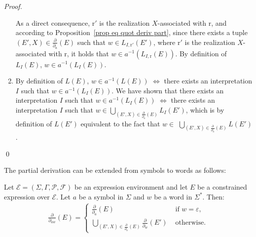 \documentclass[a4paper]{llncs}
\begin{document}
\begin{proof}
\begin{enumerate}
      As a direct consequence, $\mathrm{r}'$ is the realization $X$-associated with $\mathrm{r}$, and according to Proposition~\ref{prop eq quot deriv part}, since there exists a tuple $(E',X)\in\frac{\partial}{\partial_a}(E)$ such that $w \in L_{I,\mathrm{r}'}(E')$, where $\mathrm{r}'$ is the realization $X$-associated with $\mathrm{r}$, it holds that $w\in a^{-1}(L_{I,\mathrm{r}}(E))$. By definition of $L_{I}(E)$, $w\in a^{-1}(L_{I}(E))$.
\item By definition of $L(E)$, $w\in a^{-1}(L(E))$ $\Leftrightarrow$ there exists an interpretation $I$ such that $w\in a^{-1}(L_I(E))$. We have shown that there exists an interpretation $I$ such that $w\in a^{-1}(L_I(E))$ $\Leftrightarrow$ there exists an interpretation $I$ such that $w\in \bigcup_{(E',X)\in\frac{\partial}{\partial_a}(E)} L_I(E')$, 
which is by definition of $L(E')$ equivalent to the fact that $w\in$ $ \bigcup_{(E',X)\in\frac{\partial}{\partial_a}(E)} L(E')$. 
    \end{enumerate}
    \qed
  \end{proof}
  
  The partial derivation can be extended from symbols to words as follows: 
  
  \begin{definition}
    Let $\mathcal{E}=(\Sigma,\Gamma,\mathcal{P},\mathcal{F})$ be an expression environment and let $E$ be a constrained expression over $\mathcal{E}$. Let $a$ be a symbol in $\Sigma$ and $w$ be a word in $\Sigma^*$. Then:
        \begin{align*}
        \frac{\partial}{\partial_{aw}}(E)=
        \begin{cases}
            \frac{\partial}{\partial_{a}}(E) & \text{ if }w=\varepsilon,\\
            \bigcup_{(E',X)\in\frac{\partial}{\partial_{a}}(E)} \frac{\partial}{\partial_{w}}(E') & \text{ otherwise.}
          \end{cases}
        \end{align*}
  \end{definition}  
  
\end{document}
